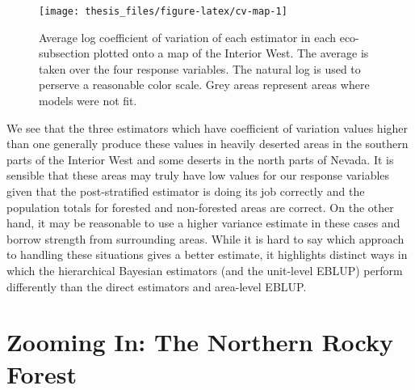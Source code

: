 \documentclass[12pt,twoside]{reedthesis}
\begin{document}
\clearpage
\begin{figure}

{\centering \texttt{[image: thesis\_files/figure-latex/cv-map-1]} 

}

\caption[Coefficient of variation map]{Average log coefficient of variation of each estimator in each eco-subsection plotted onto a map of the Interior West. The average is taken over the four response variables. The natural log is used to perserve a reasonable color scale. Grey areas represent areas where models were not fit.}\label{fig:cv-map}
\end{figure}
We see that the three estimators which have coefficient of variation values higher than one generally produce these values in heavily deserted areas in the southern parts of the Interior West and some deserts in the north parts of Nevada. It is sensible that these areas may truly have low values for our response variables given that the post-stratified estimator is doing its job correctly and the population totals for forested and non-forested areas are correct. On the other hand, it may be reasonable to use a higher variance estimate in these cases and borrow strength from surrounding areas. While it is hard to say which approach to handling these situations gives a better estimate, it highlights distinct ways in which the hierarchical Bayesian estimators (and the unit-level EBLUP) perform differently than the direct estimators and area-level EBLUP.
\clearpage

\hypertarget{zooming-in-the-northern-rocky-forest}{%
\section{Zooming In: The Northern Rocky Forest}\label{zooming-in-the-northern-rocky-forest}}
\end{document}
